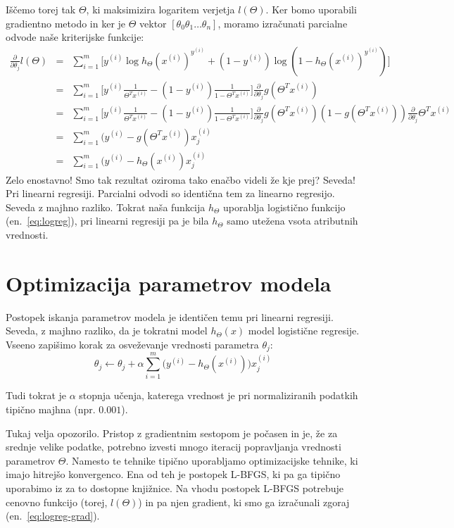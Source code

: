 Iščemo torej tak $\Theta$, ki maksimizira logaritem verjetja $l(\Theta)$. Ker bomo uporabili gradientno metodo in ker je $\Theta$ vektor $[\theta_0 \theta_1 \ldots \theta_n]$, moramo izračunati parcialne odvode naše kriterijske funkcije:
\begin{eqnarray}
  \frac{\partial}{\partial\theta_j}l(\Theta)
  & = & \sum_{i=1}^m \big[y^{(i)}\log h_\Theta(x^{(i)})^{y^{(i)}}+(1-y^{(i)})\log (1-h_\Theta(x^{(i)})^{y^{(i)}}) \big] \nonumber \\
  & = & \sum_{i=1}^m \big[y^{(i)}\frac{1}{\Theta^T x^{(i)}}-(1-y^{(i)})\frac{1}{1-\Theta^T x^{(i)}} \big]\frac{\partial}{\partial\theta_j}g(\Theta^T x^{(i)}) \nonumber\\
  & = & \sum_{i=1}^m \big[y^{(i)}\frac{1}{\Theta^T x^{(i)}}-(1-y^{(i)})\frac{1}{1-\Theta^T x^{(i)}} \big]\frac{\partial}{\partial\theta_j}g(\Theta^T x^{(i)})(1-g(\Theta^T x^{(i)}))
  \frac{\partial}{\partial\theta_j}\Theta^T x^{(i)}\nonumber\\
  & = & \sum_{i=1}^m (y^{(i)}-g(\Theta^T x^{(i)})x_j^{(i)}\nonumber\\
  & = & \sum_{i=1}^m (y^{(i)}-h_\Theta(x^{(i)})x_j^{(i)}\nonumber
  \label{eq:logreg-grad}
\end{eqnarray}
Zelo enostavno! Smo tak rezultat oziroma tako enačbo videli že kje prej? Seveda! Pri linearni regresiji. Parcialni odvodi so identična tem za linearno regresijo. Seveda z majhno razliko. Tokrat naša funkcija $h_\Theta$ uporablja logistično funkcijo (en.~\ref{eq:logreg}), pri linearni regresiji pa je bila $h_\Theta$ samo utežena vsota atributnih vrednosti.

\section{Optimizacija parametrov modela}

Postopek iskanja parametrov modela je identičen temu pri linearni regresiji. Seveda, z majhno razliko, da je tokratni model $h_\Theta(x)$ model logistične regresije. Vseeno zapišimo korak za osveževanje vrednosti parametra $\theta_j$:
\begin{equation}
  \theta_j\leftarrow\theta_j+\alpha\sum_{i=1}^{m}\big(y^{(i)}-h_\Theta(x^{(i)})\big) x_j^{(i)}
\end{equation}

Tudi tokrat je $\alpha$ stopnja učenja, katerega vrednost je pri normaliziranih podatkih tipično majhna (npr. $0.001$).

Tukaj velja opozorilo. Pristop z gradientnim sestopom je počasen in je, že za srednje velike podatke, potrebno izvesti mnogo iteracij popravljanja vrednosti parametrov $\Theta$. Namesto te tehnike tipično uporabljamo optimizacijske tehnike, ki imajo hitrejšo konvergenco. Ena od teh je postopek L-BFGS, ki pa ga tipično uporabimo iz za to dostopne knjižnice. Na vhodu postopek L-BFGS potrebuje cenovno funkcijo (torej, $l(\Theta)$) in pa njen gradient, ki smo ga izračunali zgoraj (en.~\ref{eq:logreg-grad}).
